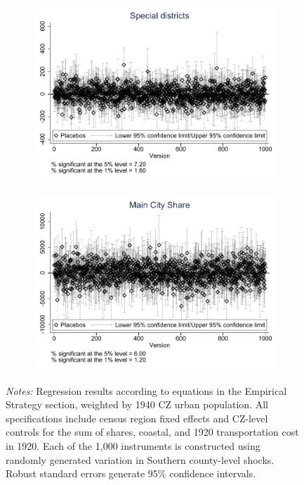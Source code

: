\documentclass{article}
\begin{document}
\begin{landscape}
\begin{figure}[htbp]
\begin{subfigure}{0.4\textwidth}
        \includegraphics[width=\linewidth]{figures/exogeneity_tests/D17_placebo_spdist_new_ctrls.pdf}
        \label{fig:sub5}
    \end{subfigure}
    \begin{subfigure}{0.4\textwidth}
        \includegraphics[width=\linewidth]{figures/exogeneity_tests/D17_placebo_totfrac_new_ctrls.pdf}
        \label{fig:sub6}
    \end{subfigure}
    \label{fig:placebo}
    \caption*{\scriptsize \emph{Notes:} Regression results according to equations in the Empirical Strategy section, weighted by 1940 CZ urban population. All specifications include census region fixed effects and CZ-level controls for the sum of shares, coastal, and 1920 transportation cost in 1920. Each of the 1,000 instruments is constructed using randomly generated variation in Southern county-level shocks. Robust standard errors generate 95\% confidence intervals.} 
\end{figure}



\end{landscape}
\end{document}
